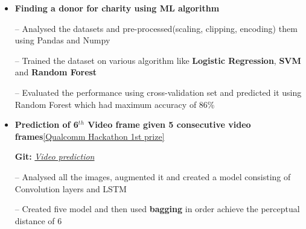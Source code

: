 \documentclass{article}
\begin{document}
\begin{itemize}
\setlength{\itemsep}{-0.15em}


\item \textbf{Finding a donor for charity using ML algorithm } %


\item[--] Analysed the datasets and pre-processed(scaling, clipping, encoding) them using Pandas and Numpy
\item[--] Trained the dataset on various algorithm like \textbf{Logistic Regression}, \textbf{SVM} and \textbf{Random Forest}
\item[--]  Evaluated the performance using cross-validation set and predicted it using Random Forest which had maximum accuracy of 86\%


\item \textbf{Prediction of {6$^{th}$} Video frame given 5 consecutive video frames}\hfill{\href{https://drive.google.com/file/d/1uwSr-1dlImn5JYRzPpn62ublzCWKSGr0/view?usp=sharing}{[Qualcomm Hackathon 1st prize]}}

\textbf{Git:} \href{https://github.com/153079019shariq/catz_contest}{\textit{Video prediction}}
\item[--] Analysed all the images, augmented it  and created a model consisting of Convolution layers and LSTM
\item[--]Created five model and then used \textbf{bagging} in order achieve the perceptual distance of 6 

\end{itemize}
\end{document}
